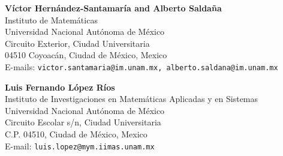 \documentclass[11pt]{article}
\numberwithin{equation}{section}
\begin{document}
\bigskip

\bigskip
\begin{flushleft}
\textbf{Víctor Hernández-Santamaría and Alberto Saldaña}\\
Instituto de Matemáticas\\
Universidad Nacional Autónoma de México\\
Circuito Exterior, Ciudad Universitaria\\
04510 Coyoacán, Ciudad de México, Mexico\\
E-mails: \texttt{victor.santamaria@im.unam.mx, alberto.saldana@im.unam.mx} 
\vspace{.3cm}
\end{flushleft}

\smallskip

\begin{flushleft}
\textbf{Luis Fernando López Ríos}\\
Instituto de Investigaciones en Matemáticas Aplicadas y en Sistemas\\
Universidad Nacional Autónoma de México\\
Circuito Escolar s/n, Ciudad Universitaria\\
C.P. 04510, Ciudad de México, Mexico\\
E-mail: \texttt{luis.lopez@mym.iimas.unam.mx} 
\vspace{.3cm}
\end{flushleft}
\end{document}

